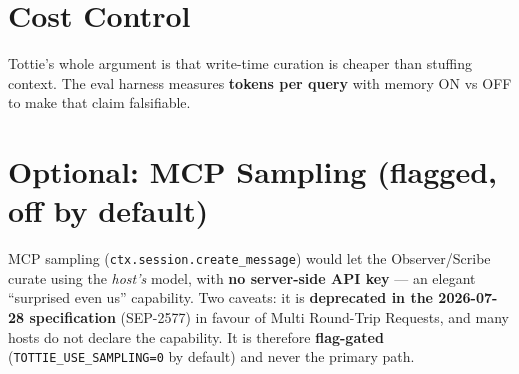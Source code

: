 \section{Cost Control}
Tottie's whole argument is that write-time curation is cheaper than stuffing context. The eval
harness measures \textbf{tokens per query} with memory ON vs OFF to make that claim falsifiable.

\section{Optional: MCP Sampling (flagged, off by default)}
MCP sampling (\texttt{ctx.session.create\_message}) would let the Observer/Scribe curate using the
\emph{host's} model, with \textbf{no server-side API key} --- an elegant ``surprised even us''
capability. Two caveats: it is \textbf{deprecated in the 2026-07-28 specification} (SEP-2577) in
favour of Multi Round-Trip Requests, and many hosts do not declare the capability. It is therefore
\textbf{flag-gated} (\texttt{TOTTIE\_USE\_SAMPLING=0} by default) and never the primary path.
